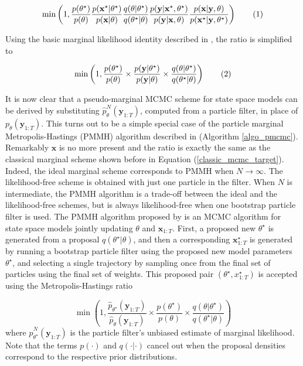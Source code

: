 \documentclass[11pt,a4,twosided,singlespacing,titlepagenumber=on]{scrreprt}
\numberwithin{equation}{chapter} %
\theoremstyle{remark}
\newcommand{\matr}[1]{\mathbf{#1}}
\newcommand\numberthis{\addtocounter{equation}{1}\tag{\theequation}}
\begin{document}
\begin{align*}
 \min \left(1, \frac{p(\theta^\star)}{p(\theta)}   \frac{p({\matr{x}}^\star|\theta^\star)}{p({\matr{x}}|\theta)}   \frac{q(\theta|\theta^\star)}{q(\theta^\star|\theta)}   \frac{p(\matr{y}|{\matr{x}}^\star,\theta^\star)}{p(\matr{y}|{\matr{x}},\theta)}  \frac{p({\matr{x}}|\matr{y},\theta)}{p({\matr{x}}^\star|\matr{y},\theta^\star)} \right) \numberthis
\end{align*}

Using the basic marginal likelihood identity described in \cite{chib1995}, the ratio is simplified to

\begin{align*}
 \min \left(1, \frac{p(\theta^\star)}{p(\theta)}  \times \frac{p(\matr{y}|\theta^\star)}{p(\matr{y}|\theta)} \times \frac{q(\theta|\theta^\star)}{q(\theta^\star|\theta)} \right) \numberthis
\end{align*}


It is now clear that a pseudo-marginal MCMC scheme for state space models can be derived by substituting $\hat{p}^N_{\theta}(\matr{y}_{1:T})$, computed from a particle filter, in place of $p_{\theta}(\matr{y}_{1:T})$. This turns out to be a simple special case of the particle marginal Metropolis-Hastings (PMMH) algorithm described in \cite{andrieu2010} (Algorithm \ref{algo_pmcmc}). Remarkably $\matr{x}$ is no more present and the ratio is exactly the same as the classical marginal scheme shown before in Equation (\ref{classic_mcmc_target}). Indeed, the ideal marginal scheme corresponds to PMMH when $N \rightarrow \infty$. The likelihood-free scheme is obtained with just one particle in the filter. When $N$ is intermediate, the PMMH algorithm is a trade-off between the ideal and the likelihood-free schemes, but is always likelihood-free when one bootstrap particle filter is used. The PMMH algorithm proposed by \cite{andrieu2010} is an MCMC algorithm for state space models jointly updating $\theta$ and $\matr{x}_{1:T}$. First, a proposed new $\theta^\star$ is generated from a proposal $q(\theta^\star|\theta)$, and then a corresponding $\matr{x}_{1:T}^\star$ is generated by running a bootstrap particle filter using the proposed new model parameters $\theta^\star$, and selecting a single trajectory by sampling once from the final set of particles using the final set of weights. This proposed pair $(\theta^\star,x_{1:T}^\star)$ is accepted using the Metropolis-Hastings ratio

\begin{equation}
\min \left(1, \frac{\hat{p}_{\theta^\star}(\matr{y}_{1:T})}{\hat{p}_{\theta}(\matr{y}_{1:T})} \times \frac{p(\theta^\star)}{p(\theta)} \times \frac{q(\theta|\theta^\star)}{q(\theta^\star|\theta)} \right)
\end{equation} 
where $\hat{p}^N_{\theta^\star}(\matr{y}_{1:T})$ is the particle filter's unbiased estimate of marginal likelihood. Note that the terms $p(\cdot)$ and $q(\cdot|\cdot)$ cancel out when the proposal densities correspond to the respective prior distributions.
\end{document}
